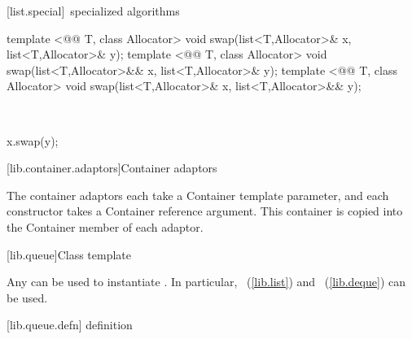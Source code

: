 \documentclass[american,twoside]{book}
\begin{document}
[list.special]{\ specialized algorithms}

\begin{itemdecl}
template <@@ T, class Allocator>
  void swap(list<T,Allocator>& x, list<T,Allocator>& y);
template <@@ T, class Allocator>
  void swap(list<T,Allocator>&& x, list<T,Allocator>& y);
template <@@ T, class Allocator>
  void swap(list<T,Allocator>& x, list<T,Allocator>&& y);
\end{itemdecl}

\begin{itemdescr}
\pnum
\effects\ 
\begin{codeblock}
x.swap(y);
\end{codeblock}
\end{itemdescr}

\setcounter{subsection}{3}
[lib.container.adaptors]{Container adaptors}

\pnum
The container adaptors each take a Container template parameter,
and each constructor takes a Container reference argument.
This
container is copied into the Container member of each adaptor.

[lib.queue]{Class template }

\pnum
{}%
Any 
can be used to instantiate
.
In particular,
\
(\ref{lib.list})
and
\
(\ref{lib.deque})
can be used.

[lib.queue.defn]{ definition}
\end{document}
